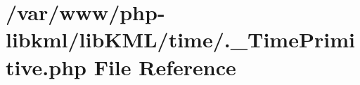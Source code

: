 \hypertarget{_8__TimePrimitive_8php}{
\section{/var/www/php-\/libkml/libKML/time/.\_\-TimePrimitive.php File Reference}
\label{d4/d0c/_8__TimePrimitive_8php}
}
